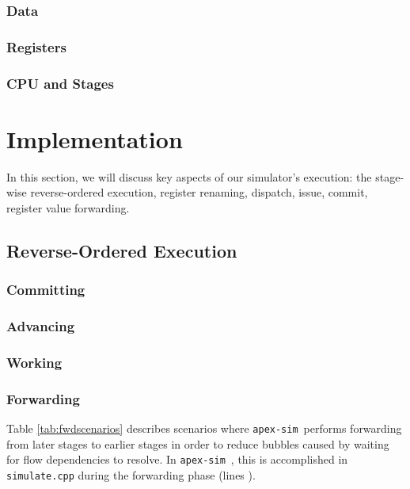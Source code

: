 \documentclass[12pt]{article}
\newcommand{\codename}[0]{\texttt{apex-sim}~}
\begin{document}
\subsubsection{Data}

\subsubsection{Registers}

\subsubsection{CPU and Stages}


\section{Implementation}
\label{sec:implementation}
In this section, we will discuss key aspects of our simulator's execution: the stage-wise reverse-ordered execution, register renaming, dispatch, issue, commit, register value forwarding.

\subsection{Reverse-Ordered Execution}

\subsubsection{Committing}


\subsubsection{Advancing}

\subsubsection{Working}

\subsubsection{Forwarding}
Table \ref{tab:fwdscenarios} describes scenarios where \codename performs forwarding from later stages to earlier stages in order to reduce bubbles caused by waiting for flow dependencies to resolve. In \codename, this is accomplished in \texttt{simulate.cpp} during the forwarding phase (lines ).
\end{document}
